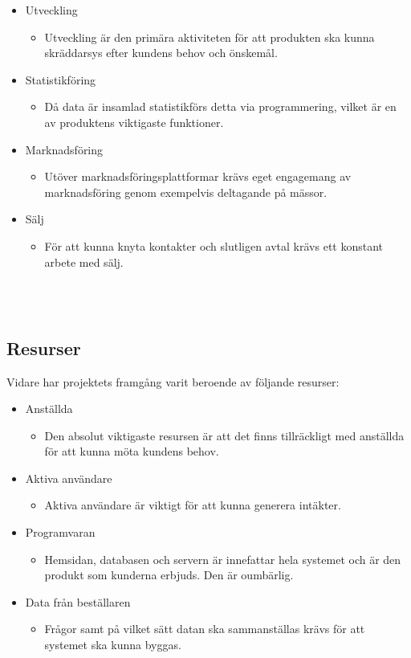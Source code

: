\documentclass[12pt]{article}
\begin{document}
\begin{itemize}
    \item Utveckling
    \begin{itemize}
        \item Utveckling är den primära aktiviteten för att produkten ska kunna skräddarsys efter kundens behov och önskemål.
    \end{itemize}
    \item Statistikföring
    \begin{itemize}
        \item Då data är insamlad statistikförs detta via programmering, vilket är en av produktens viktigaste funktioner.
    \end{itemize}
    \item Marknadsföring
    \begin{itemize}
        \item Utöver marknadsföringsplattformar krävs eget engagemang av marknadsföring genom exempelvis deltagande på mässor.
    \end{itemize}
    \item Sälj
    \begin{itemize}
        \item För att kunna knyta kontakter och slutligen avtal krävs ett konstant arbete med sälj.
    \end{itemize}
\end{itemize}\\\\

\subsection{Resurser}
Vidare har projektets framgång varit beroende av följande resurser:
\begin{itemize}
    \item Anställda
    \begin{itemize}
        \item Den absolut viktigaste resursen är att det finns tillräckligt med anställda för att kunna möta kundens behov.
    \end{itemize}
    \item Aktiva användare
    \begin{itemize}
        \item Aktiva användare är viktigt för att kunna generera intäkter.
    \end{itemize}
    \item Programvaran
    \begin{itemize}
        \item Hemsidan, databasen och servern är innefattar hela systemet och är den produkt som kunderna erbjuds. Den är oumbärlig.
    \end{itemize}
    \item Data från beställaren
    \begin{itemize}
        \item Frågor samt på vilket sätt datan ska sammanställas krävs för att systemet ska kunna byggas.
    \end{itemize}
\end{itemize}
\end{document}
